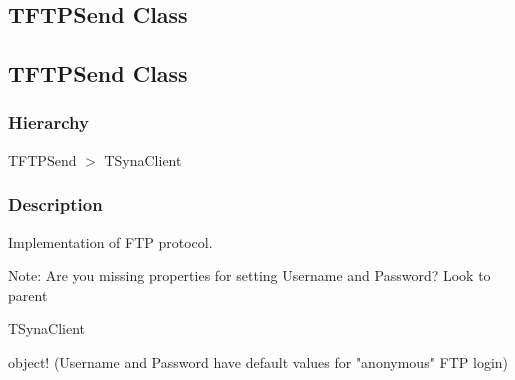 \documentclass{report}
\begin{document}
\subsection*{\large{\textbf{TFTPSend Class}}\normalsize\hspace{1ex}\hrulefill}
\else
\subsection*{TFTPSend Class}
\fi
\label{ftpsend.TFTPSend}
\subsubsection*{\large{\textbf{Hierarchy}}\normalsize\hspace{1ex}\hfill}
TFTPSend {$>$} TSynaClient
\subsubsection*{\large{\textbf{Description}}\normalsize\hspace{1ex}\hfill}
Implementation of FTP protocol.\hfill\vspace*{1ex}

 Note: Are you missing properties for setting Username and Password? Look to parent \begin{ttfamily}TSynaClient\end{ttfamily} object! (Username and Password have default values for "anonymous" FTP login)
\end{document}
